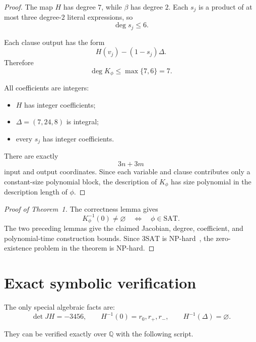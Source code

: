 \documentclass[11pt]{article}
\begin{document}
\begin{proof}

The map $H$ has degree $7$, while $\beta$ has degree $2$.  Each $s_j$ is a
product of at most three degree-$2$ literal expressions, so
\[
\deg s_j\leq 6.
\]

Each clause output has the form
\[
H(v_j)-(1-s_j)\Delta.
\]
Therefore
\[
\deg K_\phi
\leq
\max\{7,6\}=7.
\]

All coefficients are integers:
\begin{itemize}
\item $H$ has integer coefficients;
\item $\Delta=(7,24,8)$ is integral;
\item every $s_j$ has integer coefficients.
\end{itemize}

There are exactly
\[
3n+3m
\]
input and output coordinates. Since each variable and clause contributes only
a constant-size polynomial block, the description of $K_\phi$ has size
polynomial in the description length of $\phi$.
\end{proof}

\begin{proof}[Proof of Theorem~1]
The correctness lemma gives
\[
K_\phi^{-1}(0)\neq\varnothing
\quad\Longleftrightarrow\quad
\phi\in\mathrm{SAT}.
\]
The two preceding lemmas give the claimed Jacobian, degree, coefficient, and
polynomial-time construction bounds.  Since $3\mathrm{SAT}$ is
NP-hard~\cite{Karp1972}, the zero-existence problem in the theorem is NP-hard.
\end{proof}

\appendix

\section{Exact symbolic verification}

The only special algebraic facts are:
\[
\det JH=-3456,
\qquad
H^{-1}(0)={r_0,r_+,r_-},
\qquad
H^{-1}(\Delta)=\varnothing.
\]

They can be verified exactly over $\mathbb{Q}$ with the following script.
\end{document}
